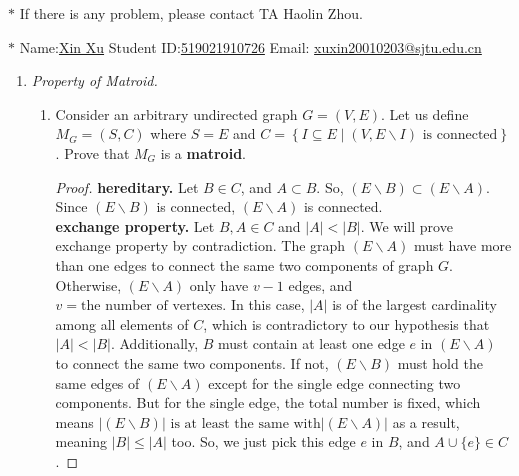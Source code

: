 \documentclass[12pt,a4paper]{article}
\theoremstyle{definition}
\begin{document}
\noindent

\noindent{}
\begin{center}
\footnotesize{\color{red}$*$ If there is any problem, please contact TA Haolin Zhou.}

\footnotesize{\color{blue}$*$ Name:\underline{Xin Xu}  \quad Student ID:\underline{519021910726} \quad Email: \underline{xuxin20010203@sjtu.edu.cn}}
\end{center}

\begin{enumerate}
\item \textit{Property of Matroid.} 
\begin{enumerate}
	\item
	Consider an arbitrary undirected graph $ G=(V,E) $. Let us define $ M_{G}=(S,C) $ where $ S=E $ and $ C=\left\{I \subseteq E \mid\left(V, E \backslash I\right) \text { is connected}\right\} $. Prove that $ M_{G} $ is a \textbf{matroid}.\par
	    \begin{proof}
	        \textbf{hereditary.} Let $B\in C$, and $A\subset B$. So, $(E \backslash B)\subset (E \backslash A)$. Since $(E \backslash B)$ is connected, $(E \backslash A)$ is connected.
			\\\textbf{exchange property.} Let $B,A\in C$ and $|A|<|B|$. We will prove exchange property by contradiction. The graph $(E\backslash A)$ must have more than one edges to connect the same two components of graph $G$. Otherwise, $(E\backslash A)$ only have $v-1$ edges, and $v=\text{the number of vertexes}$. In this case, $|A|$ is of the largest cardinality among all elements of $C$,
			                            which is contradictory to our hypothesis that $|A|<|B|$. Additionally, $B$ must contain at least one edge $e$ in $(E\backslash A)$ to connect the same two components. If not, $(E\backslash B)$ must hold the same edges of $(E\backslash A)$ except for the single edge connecting two components. But for the single edge, the total number is fixed, which means $|(E\backslash B)|\text{ is at least the same with} |(E\backslash A)|$ as a result,
										meaning $|B|\leqslant |A|$ too. So, we just pick this edge $e$ in $B$, and $A\cup \{e\}\in C$.

\end{proof}
\end{enumerate}
\end{enumerate}
\end{document}
